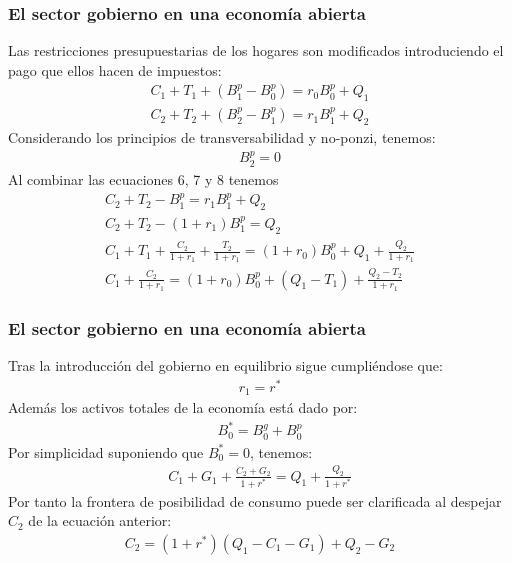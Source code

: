 \documentclass[10pt, xcolor=table, x11names]{beamer}
\begin{document}
\begin{frame}[label=10]
	\frametitle{{\normalsize El sector gobierno en una economía abierta} {}}
	Las restricciones presupuestarias de los hogares son modificados introduciendo el pago que ellos hacen de impuestos:
	\begin{align}
			C_{1}+T_{1}+(B_{1}^{p}-B_{0}^{p})=r_{0}B_{0}^{p}+Q_{1}\\
			C_{2}+T_{2}+(B_{2}^{p}-B_{1}^{p})=r_{1}B_{1}^{p}+Q_{2}
	\end{align}
	Considerando los principios de transversabilidad y no-ponzi, tenemos:
	\begin{align}
		B_{2}^{p}=0
	\end{align}
	Al combinar las ecuaciones 6, 7 y 8 tenemos
	\begin{align}
		C_{2}+T_{2}-B_{1}^{p}=r_{1}B_{1}^{p}+Q_{2}\nonumber\\
		C_{2}+T_{2}-(1+r_{1})B_{1}^{p}=Q_{2}\nonumber\\
		C_{1}+T_{1}+\frac{C_{2}}{1+r_{1}}+\frac{T_{2}}{1+r_{1}}=(1+r_{0})B_{0}^{p}+Q_{1}+\frac{Q_{2}}{1+r_{1}}\nonumber\\
		C_{1}+\frac{C_{2}}{1+r_{1}}=(1+r_{0})B_{0}^{p}+(Q_{1}-T_{1})+\frac{Q_{2}-T_{2}}{1+r_{1}}
	\end{align}
\end{frame}

\begin{frame}[label=11]
	\frametitle{{\normalsize El sector gobierno en una economía abierta} {}}
	Tras la introducción del gobierno en equilibrio sigue cumpliéndose que:
	\begin{align}
	r_{1}=	r^{*}
	\end{align}
	Además los activos totales de la economía está dado por:
	 \begin{align}
	B_{0}^{*}=B_{0}^{g}+B_{0}^{p}
	 \end{align}
	 Por simplicidad suponiendo que $ B_{0}^{*}=0 $, tenemos:
	\begin{align}
	 C_{1}+G_{1}+\frac{C_{2}+G_{2}}{1+r^{*}}=Q_{1}+\frac{Q_{2}}{1+r^{*}}
	 \end{align}
	 Por tanto la frontera de posibilidad de consumo puede ser clarificada al despejar $C_{2} $ de la ecuación anterior:
	 \begin{align}
	 C_{2}=(1+r^{*})(Q_{1}-C_{1}-G_{1})+Q_{2}-G_{2}
	 \end{align}
\end{frame}
\end{document}
